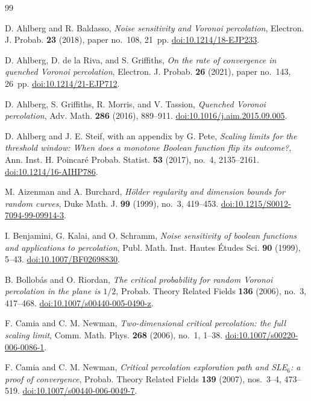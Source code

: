 \begin{thebibliography}{99}

D. Ahlberg and R. Baldasso,
\emph{Noise sensitivity and Voronoi percolation},
Electron. J. Probab. \textbf{23} (2018), paper no.~108, 21~pp.
\href{https://doi.org/10.1214/18-EJP233}{doi:10.1214/18-EJP233}.

D. Ahlberg, D. de la Riva, and S. Griffiths,
\emph{On the rate of convergence in quenched Voronoi percolation},
Electron. J. Probab. \textbf{26} (2021), paper no.~143, 26~pp.
\href{https://doi.org/10.1214/21-EJP712}{doi:10.1214/21-EJP712}.

D. Ahlberg, S. Griffiths, R. Morris, and V. Tassion,
\emph{Quenched Voronoi percolation},
Adv. Math. \textbf{286} (2016), 889--911.
\href{https://doi.org/10.1016/j.aim.2015.09.005}{doi:10.1016/j.aim.2015.09.005}.

D. Ahlberg and J. E. Steif, with an appendix by G. Pete,
\emph{Scaling limits for the threshold window: When does a monotone
Boolean function flip its outcome?},
Ann. Inst. H. Poincar\'e Probab. Statist. \textbf{53} (2017), no.~4,
2135--2161.
\href{https://doi.org/10.1214/16-AIHP786}{doi:10.1214/16-AIHP786}.

M. Aizenman and A. Burchard,
\emph{H\"older regularity and dimension bounds for random curves},
Duke Math. J. \textbf{99} (1999), no.~3, 419--453.
\href{https://doi.org/10.1215/S0012-7094-99-09914-3}{doi:10.1215/S0012-7094-99-09914-3}.

I. Benjamini, G. Kalai, and O. Schramm,
\emph{Noise sensitivity of boolean functions and applications to
percolation},
Publ. Math. Inst. Hautes \'Etudes Sci. \textbf{90} (1999), 5--43.
\href{https://doi.org/10.1007/BF02698830}{doi:10.1007/BF02698830}.

B. Bollob\'as and O. Riordan,
\emph{The critical probability for random Voronoi percolation in the
plane is $1/2$},
Probab. Theory Related Fields \textbf{136} (2006), no.~3, 417--468.
\href{https://doi.org/10.1007/s00440-005-0490-z}{doi:10.1007/s00440-005-0490-z}.

F. Camia and C. M. Newman,
\emph{Two-dimensional critical percolation: the full scaling limit},
Comm. Math. Phys. \textbf{268} (2006), no.~1, 1--38.
\href{https://doi.org/10.1007/s00220-006-0086-1}{doi:10.1007/s00220-006-0086-1}.

F. Camia and C. M. Newman,
\emph{Critical percolation exploration path and SLE$_6$: a proof of
convergence},
Probab. Theory Related Fields \textbf{139} (2007), nos.~3--4, 473--519.
\href{https://doi.org/10.1007/s00440-006-0049-7}{doi:10.1007/s00440-006-0049-7}.


\end{thebibliography}
